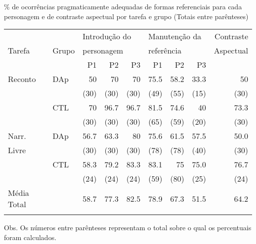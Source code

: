 \documentclass[output=paper,colorlinks,citecolor=brown,booklanguage=portuguese]{langscibook}
\begin{document}
\begin{Tabela}
\caption{\% de ocorrências pragmaticamente adequadas de formas referenciais para cada personagem e de contraste aspectual por tarefa e grupo (Totais entre parênteses) }
\label{tab:cap15tab1}


\begin{tabularx}{\textwidth}{Xlrrrrrrr}
\lsptoprule
        &    & \multicolumn{3}{l}{Introdução do}    & \multicolumn{3}{l}{Manutenção da}    & Contraste \\
 Tarefa & Grupo    & \multicolumn{3}{l}{personagem}     & \multicolumn{3}{l}{referência}     & Aspectual\\
\midrule
 \addlinespace
        &    & P1  & P2    &	P3  &	P1  &	P2   &	P3\\
Reconto &DAp &	50 & 70    & 70     & 75.5  & 58.2   &33.3  &50\\
        &    & (30)& (30)  & (30)   &(49)   &(55)    &(15)  &(30)\\
        & CTL& 70  & 96.7  & 96.7   &81.5   &74.6    &40    &73.3\\
        &    & (30)& (30)  &(30)    & (65)  & (59)   & (20) &(30)\\
\hline
Narr.   & DAp& 56.7&63.3   &80      &75.6   &61.5    &57.5  &50.0\\
Livre   &    & (30)&(30)   &(30)    & (78)  & (78)   & (40) & (30)\\
        & CTL& 58.3&79.2   &83.3    &83.1   &75      &75.0  &76.7\\
        &    & (24)&(24)   &(24)    &(59)   &(80)    &(25)  &(24)\\
\midrule
Média Total& &58.7&77.3    &	82.5& 78.9  &	67.3&	51.5&	64.2\\
\lspbottomrule
\end{tabularx}


\parbox{\textwidth}{\footnotesize Obs. Os números entre parênteses representam o total sobre o qual os percentuais foram calculados.}
\end{Tabela}
\end{document}

